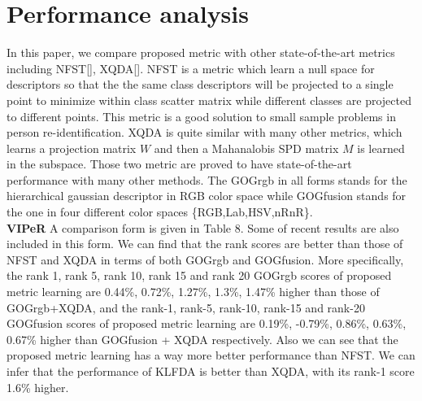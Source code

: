 \section{Performance analysis}
In this paper, we compare proposed metric with other state-of-the-art metrics including NFST[], XQDA[]. NFST is a metric which learn a null space for descriptors so that the the same class descriptors will be projected to  
a single point to minimize within class scatter matrix while different classes are projected to different points. This metric is a good solution to small sample problems in person re-identification. XQDA is quite similar with many other metrics, which learns a projection matrix $W$ and then a Mahanalobis SPD matrix $M$ is learned in the subspace. Those two metric are proved to have state-of-the-art performance with many other methods. The GOGrgb in all forms stands for the hierarchical gaussian descriptor in RGB color space while GOGfusion stands for the one in four different color spaces \{RGB,Lab,HSV,nRnR\}.\\
\textbf{VIPeR} A comparison form is given in Table 8. Some of recent results are also included in this form. We can find that the rank scores are better than those of NFST and XQDA in terms of both GOGrgb and GOGfusion. More specifically, the rank 1, rank 5, rank 10, rank 15 and rank 20 GOGrgb scores of proposed metric learning are 0.44\%, 0.72\%, 1.27\%, 1.3\%, 1.47\% higher than those of GOGrgb+XQDA, and the rank-1, rank-5, rank-10, rank-15 and rank-20 GOGfusion scores of proposed metric learning are 0.19\%, -0.79\%, 0.86\%, 0.63\%, 0.67\% higher than GOGfusion + XQDA respectively. Also we can see that the proposed metric learning has a way more better performance than NFST. We can infer that the performance of KLFDA is better than XQDA, with its rank-1 score 1.6\% higher.  \newline 
